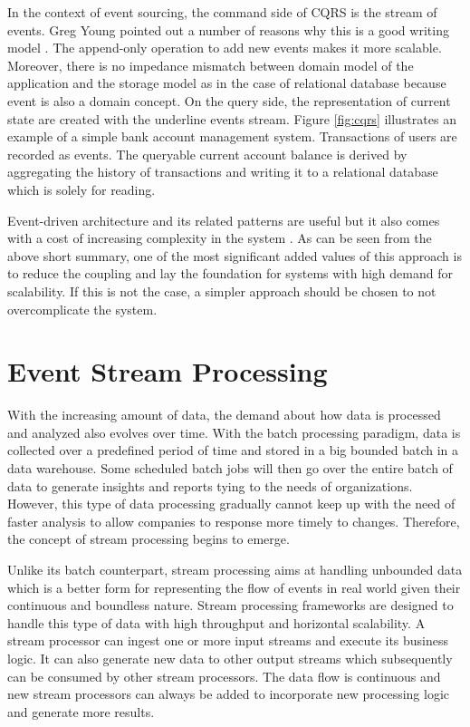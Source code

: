 In the context of event sourcing, the command side of CQRS is the stream of events. Greg Young pointed out a number of reasons why this is a good writing model \cite{cqrsgregyoung}. The append-only operation to add new events makes it more scalable. Moreover, there is no impedance mismatch between domain model of the application and the storage model as in the case of relational database because event is also a domain concept. On the query side, the representation of current state are created with the underline events stream. Figure \ref{fig:cqrs} illustrates an example of a simple bank account management system. Transactions of users are recorded as events. The queryable current account balance is derived by aggregating the history of transactions and writing it to a relational database which is solely for reading.

Event-driven architecture and its related patterns are useful but it also comes with a cost of increasing complexity in the system \cite{eventsourcingishard1} \cite{eventsourcingishard2}. As can be seen from the above short summary, one of the most significant added values of this approach is to reduce the coupling and lay the foundation for systems with high demand for scalability. If this is not the case, a simpler approach should be chosen to not overcomplicate the system.




\section{Event Stream Processing} \label{section:eventstreamprocessing}
With the increasing amount of data, the demand about how data is processed and analyzed also evolves over time. With the batch processing paradigm, data is collected over a predefined period of time and stored in a big bounded batch in a data warehouse. Some scheduled batch jobs will then go over the entire batch of data to generate insights and reports tying to the needs of organizations. However, this type of data processing gradually cannot keep up with the need of faster analysis to allow companies to response more timely to changes. Therefore, the concept of stream processing begins to emerge.


Unlike its batch counterpart, stream processing aims at handling unbounded data which is a better form for representing the flow of events in real world given their continuous and boundless nature. Stream processing frameworks are designed to handle this type of data with high throughput and horizontal scalability. A stream processor can ingest one or more input streams and execute its business logic. It can also generate new data to other output streams which subsequently can be consumed by other stream processors. The data flow is continuous and new stream processors can always be added to incorporate new processing logic and generate more results.

